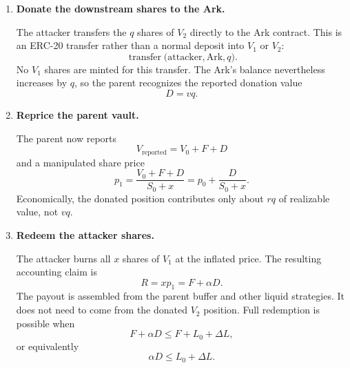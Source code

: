 \documentclass[11pt]{article}
\begin{document}
\begin{enumerate}
    Let $L_0$ be liquid assets available before the attack, excluding $F$.  If this amount is insufficient for the intended redemption, the attacker uses public withdrawals or deallocation functions to move $\Delta L$ from invested strategies into withdrawable base assets:
    \begin{equation}
        L_0+F \longrightarrow L_0+F+\Delta L.
    \end{equation}
    This operation changes liquidity composition without creating the false NAV.  In the Summer Finance transaction, permissionless Morpho V2 deallocation reportedly served this role.

    \item \textbf{Donate the downstream shares to the Ark.}

    The attacker transfers the $q$ shares of $V_2$ directly to the Ark contract.  This is an ERC-20 transfer rather than a normal deposit into $V_1$ or $V_2$:
    \begin{equation}
        \operatorname{transfer}
        \bigl(\text{attacker},\text{Ark},q\bigr).
    \end{equation}
    No $V_1$ shares are minted for this transfer.  The Ark's balance nevertheless increases by $q$, so the parent recognizes the reported donation value
    \begin{equation}
        D = vq.
    \end{equation}

    \item \textbf{Reprice the parent vault.}

    The parent now reports
    \begin{equation}
        V_{\mathrm{reported}} = V_0+F+D
    \end{equation}
    and a manipulated share price
    \begin{equation}
        p_1 = \frac{V_0+F+D}{S_0+x}
            = p_0 + \frac{D}{S_0+x}.
    \end{equation}
    Economically, the donated position contributes only about $rq$ of realizable value, not $vq$.

    \item \textbf{Redeem the attacker shares.}

    The attacker burns all $x$ shares of $V_1$ at the inflated price.  The resulting accounting claim is
    \begin{equation}
        R = xp_1 = F+\alpha D.
    \end{equation}
    The payout is assembled from the parent buffer and other liquid strategies.  It does not need to come from the donated $V_2$ position.  Full redemption is possible when
    \begin{equation}
        F+\alpha D \leq F+L_0+\Delta L,
    \end{equation}
    or equivalently
    \begin{equation}
        \alpha D \leq L_0+\Delta L.
    \end{equation}


\end{enumerate}
\end{document}
